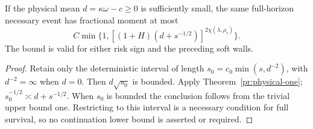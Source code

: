 \begin{corollary}\label{pr:physical-drift}
If the physical mean $d=\kappa\omega-c\ge0$ is sufficiently small, the
same full-horizon necessary event has fractional moment at most
\[
 C\min\{1,[(1+H)(d+s^{-1/2})]^{2\chi(\lambda,\rho_\tau)}\}.
\]
The bound is valid for either risk sign and the preceding soft walls.
\end{corollary}
\begin{proof}
Retain only the deterministic interval of length
$s_0=c_0\min(s,d^{-2})$, with $d^{-2}=\infty$ when $d=0$.
Then $d\sqrt{s_0}$ is bounded. Apply Theorem~\ref{pr:physical-one};
$s_0^{-1/2}\asymp d+s^{-1/2}$. When $s_0$ is bounded the conclusion
follows from the trivial upper bound one. Restricting to this interval
is a necessary condition for full survival, so no continuation lower
bound is asserted or required.
\end{proof}

